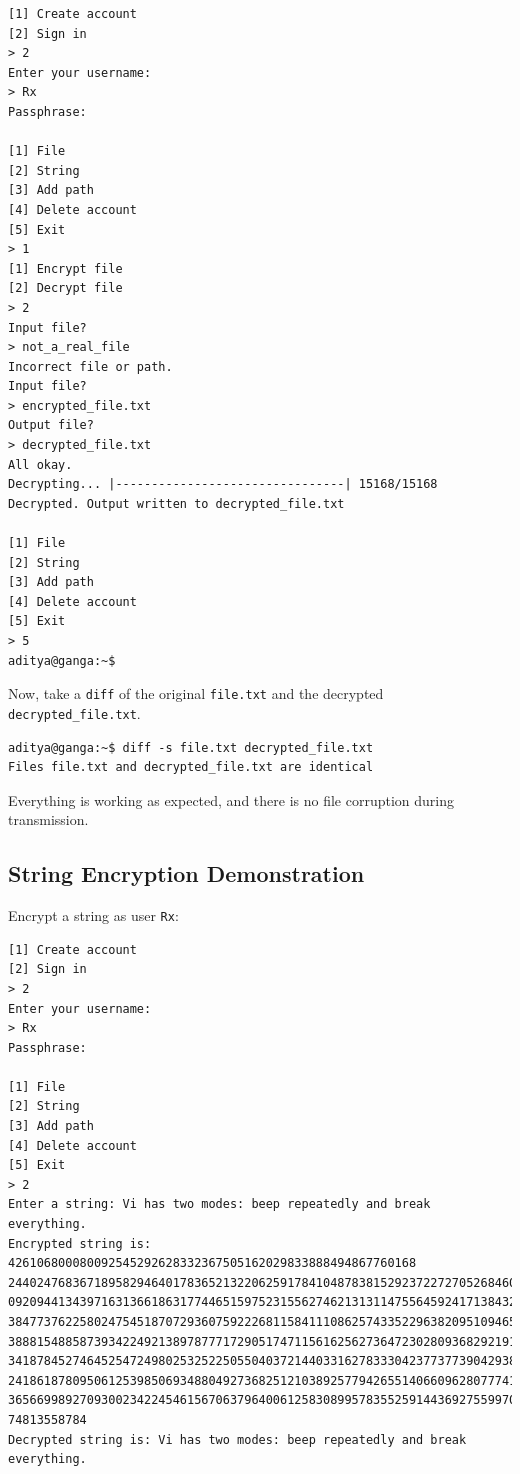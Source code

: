 \documentclass[titlepage]{article}
\begin{document}
\begin{verbatim}
[1] Create account
[2] Sign in
> 2
Enter your username:
> Rx
Passphrase:

[1] File
[2] String
[3] Add path
[4] Delete account
[5] Exit
> 1
[1] Encrypt file
[2] Decrypt file
> 2
Input file?
> not_a_real_file
Incorrect file or path.
Input file?
> encrypted_file.txt
Output file?
> decrypted_file.txt
All okay.
Decrypting... |--------------------------------| 15168/15168
Decrypted. Output written to decrypted_file.txt

[1] File
[2] String
[3] Add path
[4] Delete account
[5] Exit
> 5
aditya@ganga:~$
\end{verbatim}
Now, take a \texttt{diff} of the original \texttt{file.txt} and the decrypted \texttt{decrypted\_file.txt}.

\begin{verbatim}
aditya@ganga:~$ diff -s file.txt decrypted_file.txt
Files file.txt and decrypted_file.txt are identical
\end{verbatim}
Everything is working as expected, and there is no file corruption during transmission.


\subsection{String Encryption Demonstration}
Encrypt a string as user \texttt{Rx}:

\begin{verbatim}
[1] Create account
[2] Sign in
> 2
Enter your username:
> Rx
Passphrase:

[1] File
[2] String
[3] Add path
[4] Delete account
[5] Exit
> 2
Enter a string: Vi has two modes: beep repeatedly and break everything.
Encrypted string is: 426106800080092545292628332367505162029833888494867760168
244024768367189582946401783652132206259178410487838152923722727052684609932933
092094413439716313661863177446515975231556274621313114755645924171384324293295
384773762258024754518707293607592226811584111086257433522963820951094653987274
388815488587393422492138978777172905174711561625627364723028093682921917085995
341878452746452547249802532522505504037214403316278333042377377390429389015262
241861878095061253985069348804927368251210389257794265514066096280777415593309
365669989270930023422454615670637964006125830899578355259144369275599709533166
74813558784
Decrypted string is: Vi has two modes: beep repeatedly and break everything.
\end{verbatim}
\end{document}
